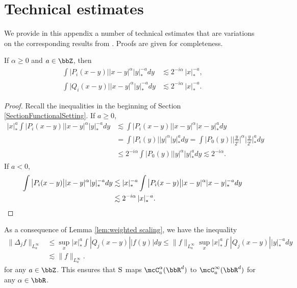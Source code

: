 \section{Technical estimates}
\label{SectionAppendix}

We provide in this appendix a number of technical estimates that are variations on the corresponding results from \cite{BH}. Proofs are given for completeness.

\begin{lem}\label{lem:weighted scaling}
If $\alpha\ge0$ and $a\in\bbZ$, then
\begin{align*}
\int \big|P_i(x-y)\big| |x-y|^\alpha|y|_*^{-a}dy&\lesssim2^{-i\alpha}\,|x|_*^{-a}, \\
\int \big|Q_i(x-y)\big| |x-y|^\alpha|y|_*^{-a}dy&\lesssim2^{-i\alpha}\,|x|_*^{-a}.
\end{align*}
\end{lem}

\begin{proof}
Recall the inequalities in the beginning of Section \ref{SectionFunctionalSetting}. If $a\ge0$,
\begin{align*}
|x|_*^a\int \big|P_i(x-y)\big| |x-y|^\alpha|y|_*^{-a}dy &\lesssim\int \big|P_i(x-y)\big| |x-y|^\alpha|x-y|_*^a dy\\
&= \int \big|P_i(y)\big| |y|^\alpha|y|_*^a dy = \int \big|P_0(y)\big| \Big|\frac{y}{2^i}\Big|^\alpha\Big|\frac{y}{2^i}\Big|_*^ady\\
&\le 2^{-i\alpha}\int \big|P_0(y)\big| |y|^\alpha |y|_*^ady\lesssim2^{-i\alpha}.
\end{align*}
If $a<0$,
\begin{align*}
\int \big|P_i(x-y)\big| |x-y|^\alpha |y|_*^{-a}dy &\lesssim|x|_*^{-a}\int \big|P_i(x-y)\big| |x-y|^\alpha|x-y|_*^{-a}dy\\
&\lesssim 2^{-i\alpha}\,|x|_*^{-a}.\qedhere
\end{align*}
\end{proof}

As a consequence of Lemma \ref{lem:weighted scaling}, we have the inequality
\begin{align*}
\|\Delta_jf\|_{L_a^\infty}
&\le\sup_x |x|_*^a\int|Q_j(x-y)||f(y)|dy
\le\|f\|_{L_a^\infty}\sup_x |x|_*^a\int|Q_j(x-y)||y|_*^{-a}dy\\
&\lesssim\|f\|_{L_a^\infty}.
\end{align*}
for any $a\in\bbZ$. This ensures that $\textsc{S}$ maps $\mcC_a^\alpha(\bbR^d)$ to $\mcC_a^\infty(\bbR^d)$ for any $\alpha\in\bbR$.

